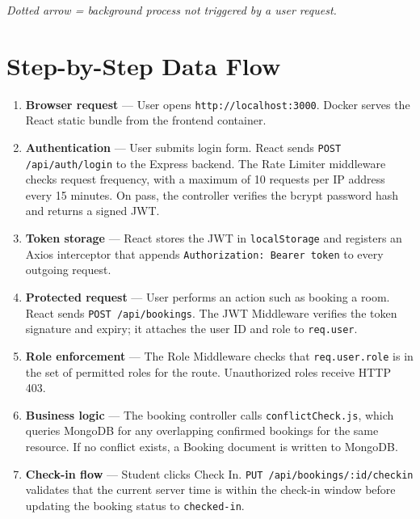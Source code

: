 \documentclass[12pt]{article}
\begin{document}
\vspace{1em}
\textit{Dotted arrow = background process not triggered by a user request.}

\section*{Step-by-Step Data Flow}

\begin{enumerate}
    \item \textbf{Browser request} --- User opens \texttt{http://localhost:3000}. Docker serves the React static bundle from the frontend container.

    \item \textbf{Authentication} --- User submits login form. React sends \texttt{POST /api/auth/login} to the Express backend. The Rate Limiter middleware checks request frequency, with a maximum of 10 requests per IP address every 15 minutes. On pass, the controller verifies the bcrypt password hash and returns a signed JWT.

    \item \textbf{Token storage} --- React stores the JWT in \texttt{localStorage} and registers an Axios interceptor that appends \texttt{Authorization: Bearer token} to every outgoing request.

    \item \textbf{Protected request} --- User performs an action such as booking a room. React sends \texttt{POST /api/bookings}. The JWT Middleware verifies the token signature and expiry; it attaches the user ID and role to \texttt{req.user}.

    \item \textbf{Role enforcement} --- The Role Middleware checks that \texttt{req.user.role} is in the set of permitted roles for the route. Unauthorized roles receive HTTP 403.

    \item \textbf{Business logic} --- The booking controller calls \texttt{conflictCheck.js}, which queries MongoDB for any overlapping confirmed bookings for the same resource. If no conflict exists, a Booking document is written to MongoDB.

    \item \textbf{Check-in flow} --- Student clicks Check In. \texttt{PUT /api/bookings/:id/checkin} validates that the current server time is within the check-in window before updating the booking status to \texttt{checked-in}.


\end{enumerate}
\end{document}

